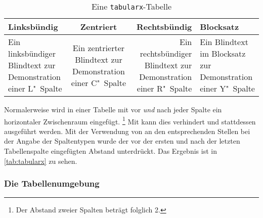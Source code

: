 \documentclass[%
  english,ngerman,%
  geometry=no,DIV=12,automark,%
]{tudscrartcl}
\begin{document}
%
\begin{Trunk}
\begin{table}
\begin{tabularx}{\textwidth}{@{}LCRY@{}}
\toprule
\textbf{Linksbündig} & \textbf{Zentriert} & 
\textbf{Rechtsbündig} & \textbf{Blocksatz} \tabularnewline
\midrule
Ein linksbündiger Blindtext zur Demonstration einer L"~Spalte &
Ein zentrierter Blindtext zur Demonstration einer C"~Spalte &
Ein rechtsbündiger Blindtext zur Demonstration einer R"~Spalte &
Ein Blindtext im Blocksatz zur Demonstration einer Y"~Spalte
\tabularnewline
\bottomrule
\end{tabularx}
\caption{Eine \texttt{tabularx}-Tabelle}\label{tab:tabularx}
\end{table}

\end{Trunk}
\InputCode
%
Normalerweise wird in einer Tabelle mit  vor 
\emph{und} nach jeder Spalte ein horizontaler Zwischenraum eingefügt.%
\footnote{Der Abstand zweier Spalten beträgt folglich 2.}
Mit  kann dies verhindert und stattdessen  
 ausgeführt werden. Mit der Verwendung von  
an den entsprechenden Stellen bei der Angabe der Spaltentypen wurde der vor der 
ersten und nach der letzten Tabellenspalte eingefügten Abstand unterdrückt.
Das Ergebnis ist in \autoref{tab:tabularx} zu sehen.


\subsubsection{Die Tabellenumgebung }
\label{sec:tabulary}
%
\end{document}
